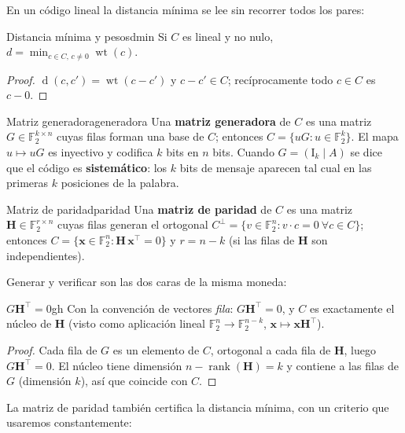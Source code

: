 \documentclass[11pt,a4paper,oneside]{report}
\newcommand{\F}{\mathbb{F}}
\newcommand{\wt}{\operatorname{wt}}
\newcommand{\rank}{\operatorname{rank}}
\newcommand{\dist}{\operatorname{d}}
\newcommand{\Hmat}{\mathbf{H}}          %
\newcommand{\vx}{\mathbf{x}}
\newcommand{\Ftwo}{\F_2}
\begin{document}
En un código lineal la distancia mínima se lee sin recorrer todos los
pares:

\begin{proposicion}{Distancia mínima y pesos}{dmin}
Si $C$ es lineal y no nulo, $d=\min_{c\in C,\,c\neq 0}\wt(c)$.
\end{proposicion}
\begin{proof}
$\dist(c,c')=\wt(c-c')$ y $c-c'\in C$; recíprocamente todo $c\in C$ es
$c-0$.
\end{proof}

\begin{definicion}{Matriz generadora}{generadora}
Una \textbf{matriz generadora} de $C$ es una matriz $G\in\Ftwo^{k\times n}$
cuyas filas forman una base de $C$; entonces
$C=\{uG\colon u\in\Ftwo^k\}$. El mapa $u\mapsto uG$ es inyectivo y codifica
$k$ bits en $n$ bits. Cuando $G=(\mathrm{I}_k\mid A)$ se dice que el código
es \textbf{sistemático}: los $k$ bits de mensaje aparecen tal cual en las
primeras $k$ posiciones de la palabra.
\end{definicion}

\begin{definicion}{Matriz de paridad}{paridad}
Una \textbf{matriz de paridad} de $C$ es una matriz
$\Hmat\in\Ftwo^{r\times n}$ cuyas filas generan el ortogonal
$C^{\perp}=\{v\in\Ftwo^n\colon v\cdot c=0\ \forall c\in C\}$; entonces
$C=\{\vx\in\Ftwo^n\colon \Hmat\,\vx^{\top}=0\}$ y $r=n-k$ (si las filas de
$\Hmat$ son independientes).
\end{definicion}

Generar y verificar son las dos caras de la misma moneda:

\begin{proposicion}{$G\Hmat^{\top}=0$}{gh}
Con la convención de vectores \emph{fila}: $G\Hmat^{\top}=0$, y
$C$ es exactamente el núcleo de $\Hmat$ (visto como aplicación lineal
$\Ftwo^n\to\Ftwo^{n-k}$, $\vx\mapsto\vx\Hmat^{\top}$).
\end{proposicion}
\begin{proof}
Cada fila de $G$ es un elemento de $C$, ortogonal a cada fila de $\Hmat$,
luego $G\Hmat^{\top}=0$. El núcleo tiene dimensión $n-\rank(\Hmat)=k$ y
contiene a las filas de $G$ (dimensión $k$), así que coincide con $C$.
\end{proof}

La matriz de paridad también certifica la distancia mínima, con un criterio
que usaremos constantemente:
\end{document}
